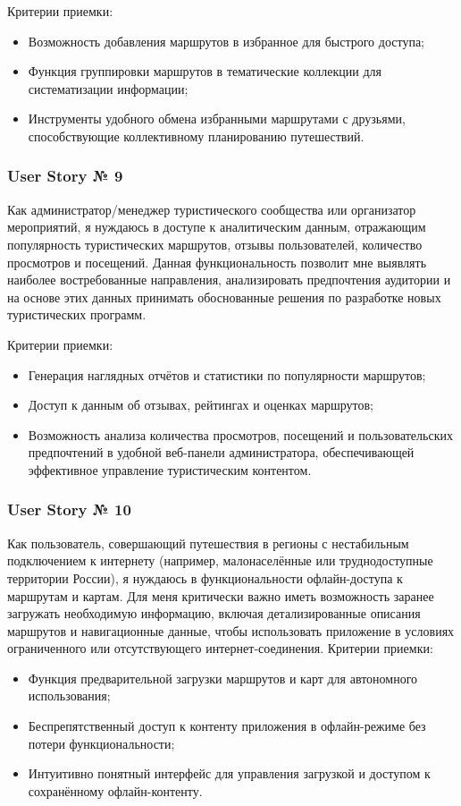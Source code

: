 Критерии приемки:
\begin{itemize}
    \item Возможность добавления маршрутов в избранное для быстрого доступа;
    \item Функция группировки маршрутов в тематические коллекции для систематизации информации;
    \item Инструменты удобного обмена избранными маршрутами с друзьями, способствующие коллективному планированию путешествий.
\end{itemize}


\subsubsection*{User Story № 9} 
Как администратор/менеджер туристического сообщества или организатор мероприятий, я нуждаюсь в доступе к аналитическим данным, отражающим популярность туристических маршрутов, отзывы пользователей, количество просмотров и посещений. Данная функциональность позволит мне выявлять наиболее востребованные направления, анализировать предпочтения аудитории и на основе этих данных принимать обоснованные решения по разработке новых туристических программ.

Критерии приемки:
\begin{itemize}
    \item Генерация наглядных отчётов и статистики по популярности маршрутов;
    \item Доступ к данным об отзывах, рейтингах и оценках маршрутов;
    \item Возможность анализа количества просмотров, посещений и пользовательских предпочтений в удобной веб-панели администратора, обеспечивающей эффективное управление туристическим контентом.
\end{itemize}

\subsubsection*{User Story № 10} 
Как пользователь, совершающий путешествия в регионы с нестабильным подключением к интернету (например, малонаселённые или труднодоступные территории России), я нуждаюсь в функциональности офлайн-доступа к маршрутам и картам. Для меня критически важно иметь возможность заранее загружать необходимую информацию, включая детализированные описания маршрутов и навигационные данные, чтобы использовать приложение в условиях ограниченного или отсутствующего интернет-соединения.
Критерии приемки:
\begin{itemize}
    \item 	Функция предварительной загрузки маршрутов и карт для автономного использования;
    \item 	Беспрепятственный доступ к контенту приложения в офлайн-режиме без потери функциональности;
    \item 	Интуитивно понятный интерфейс для управления загрузкой и доступом к сохранённому офлайн-контенту.
\end{itemize}


